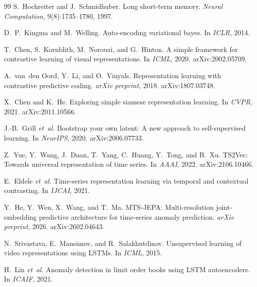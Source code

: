 \documentclass[11pt]{article}
\begin{document}
\begin{thebibliography}{99}
S.~Hochreiter and J.~Schmidhuber.
\newblock Long short-term memory.
\newblock \emph{Neural Computation}, 9(8):1735--1780, 1997.

D.~P.~Kingma and M.~Welling.
\newblock Auto-encoding variational bayes.
\newblock In \emph{ICLR}, 2014.

T.~Chen, S.~Kornblith, M.~Norouzi, and G.~Hinton.
\newblock A simple framework for contrastive learning of visual representations.
\newblock In \emph{ICML}, 2020. arXiv:2002.05709.

A.~van~den Oord, Y.~Li, and O.~Vinyals.
\newblock Representation learning with contrastive predictive coding.
\newblock \emph{arXiv preprint}, 2018. arXiv:1807.03748.

X.~Chen and K.~He.
\newblock Exploring simple siamese representation learning.
\newblock In \emph{CVPR}, 2021. arXiv:2011.10566.

J.-B.~Grill \emph{et~al.}
\newblock Bootstrap your own latent: A new approach to self-supervised learning.
\newblock In \emph{NeurIPS}, 2020. arXiv:2006.07733.

Z.~Yue, Y.~Wang, J.~Duan, T.~Yang, C.~Huang, Y.~Tong, and B.~Xu.
\newblock TS2Vec: Towards universal representation of time series.
\newblock In \emph{AAAI}, 2022. arXiv:2106.10466.

E.~Eldele \emph{et~al.}
\newblock Time-series representation learning via temporal and contextual contrasting.
\newblock In \emph{IJCAI}, 2021.

Y.~He, Y.~Wen, X.~Wang, and T.~Ma.
\newblock MTS-JEPA: Multi-resolution joint-embedding predictive architecture for time-series anomaly prediction.
\newblock \emph{arXiv preprint}, 2026. arXiv:2602.04643.

N.~Srivastava, E.~Mansimov, and R.~Salakhutdinov.
\newblock Unsupervised learning of video representations using LSTMs.
\newblock In \emph{ICML}, 2015.

H.~Lin \emph{et~al.}
\newblock Anomaly detection in limit order books using LSTM autoencoders.
\newblock In \emph{ICAIF}, 2021.


\end{thebibliography}
\end{document}

